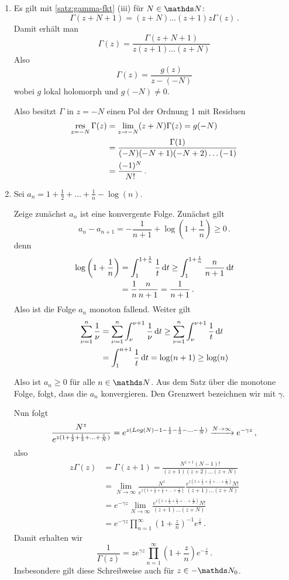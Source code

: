 \begin{bewe}
\begin{enumerate}
\item Es gilt mit \autoref{satz:gamma-fkt} (iii) für $N\in\NN$:
\[
	\Gamma(z+N+1)
	= (z+N)\ldots(z+1)z\Gamma(z)
	\,.
\]
Damit erhält man
\[
	\Gamma(z)
	= \frac{\Gamma(z+N+1)}{z(z+1) \ldots (z+N)}
\]
Also
\[
	\Gamma(z) = \frac{g(z)}{z-(-N)}
\]
wobei $g$ lokal holomorph und $g(-N) \not=0$.

Also besitzt $\Gamma$ in $z=-N$ einen Pol der Ordnung 1 mit Residuen
\begin{align*}
	\operatorname*{res}_{z=-N} \Gamma(z)
	&= \lim _{z\to-N} (z+N)\Gamma(z)
	= g(-N) \\
	&= \frac{\Gamma(1)}{(-N)(-N+1)(-N+2)\ldots(-1)} \\
	&= \frac{(-1)^N}{N!}
	\,.
\end{align*}

\item Sei $a_n = 1 + \frac{1}{2} + \ldots + \frac{1}{n} - \log(n)$.

Zeige zunächst $a_n$ ist eine konvergente Folge.
Zunächst gilt
\[
	a_n - a_{n+1}
	= -\frac{1}{n+1} + \log\left(1+\frac{1}{n}\right)
	\geq 0
	\,.
\]
denn 
\begin{align*}
	\log\left(1+\frac{1}{n}\right)
	&= \int_1^{1+\frac{1}{n}} \frac{1}{t} \,\mathrm{d} t
	\geq \int_1^{1+\frac{1}{n}} \frac{n}{n+1} \,\mathrm{d} t \\
	&= \frac{1}{n}\frac{n}{n+1}
	= \frac{1}{n+1}
	\,.
\end{align*}
Also ist die Folge $a_n$ monoton fallend.
Weiter gilt
\begin{align*}
	\sum_{\nu=1}^n \frac{1}{\nu}
	&= \sum_{\nu=1}^n \int_\nu^{\nu+1} \frac{1}{\nu}\,\mathrm{d} t
	\geq \sum_{\nu=1}^n \int_\nu^{\nu+1} \frac{1}{t}\,\mathrm{d} t \\
	&= \int_1^{n+1}\frac{1}{t}\,\mathrm{d} t
	= \log(n+1)
	\geq \log(n)
\end{align*}

Also ist $a_n \geq 0$ für alle $n\in\NN$.
Aus dem Satz über die monotone Folge, folgt, dass die $a_n$ konvergieren.
Den Grenzwert bezeichnen wir mit $\gamma$.

Nun folgt
\[
	\frac{N^z}{e^{z(1+\frac{1}{2} + \frac{1}{3} + \ldots + \frac{1}{N})}}
	= e^{z(Log(N)- 1 - \frac{1}{2} - \frac{1}{3} - \ldots - \frac{1}{N})}
	\xrightarrow{N\to\infty} e^{-\gamma z}
	\,,
\]
also
\begin{align*}
	z\Gamma(z)
	&= \Gamma(z+1) 
	= \frac{N^{z+1} (N-1)!}{(z+1)(z+2)\ldots(z+N)} \\
	&= \lim_{N\to\infty} \frac{N^z}{e^{z(1+\frac{1}{2} + \frac{1}{3} + \ldots + \frac{1}{N})}} \frac{e^{z(1+\frac{1}{2} + \frac{1}{3} + \ldots + \frac{1}{N})}N!}{(z+1)\ldots(z+N)} \\
	&= e^{-\gamma z} \lim_{N\to\infty} \frac{e^{z(1+\frac{1}{2} + \frac{1}{3} + \ldots + \frac{1}{N})}N!}{(z+1)\ldots(z+N)} \\
	&= e^{-\gamma z} \prod_{n=1}^\infty \left(1+\frac{z}{n}\right)^{-1}e^{\frac{z}{n}}
	\,.
\end{align*}
Damit erhalten wir
\[
	\frac{1}{\Gamma(z)}
	= ze^{\gamma z} \prod_{n=1}^\infty \left(1+\frac{z}{n}\right)e^{-\frac{z}{n}}
	\,.
\]
Insbesondere gilt diese Schreibweise auch für $z\in-\NN_0$.


\end{enumerate}
\end{bewe}
